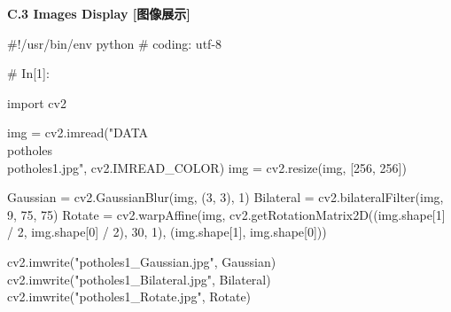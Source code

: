 \documentclass{MathorCupmodeling}
\begin{document}
\textbf{C.3 Images Display [图像展示]}
\begin{python}
#!/usr/bin/env python
# coding: utf-8

# In[1]:


import cv2

img = cv2.imread("DATA\\potholes\\potholes1.jpg", cv2.IMREAD_COLOR)
img = cv2.resize(img, [256, 256])

Gaussian = cv2.GaussianBlur(img, (3, 3), 1)
Bilateral = cv2.bilateralFilter(img, 9, 75, 75)
Rotate = cv2.warpAffine(img, cv2.getRotationMatrix2D((img.shape[1] / 2, img.shape[0] / 2), 30, 1),
                        (img.shape[1], img.shape[0]))

cv2.imwrite("potholes1_Gaussian.jpg", Gaussian)
cv2.imwrite("potholes1_Bilateral.jpg", Bilateral)
cv2.imwrite("potholes1_Rotate.jpg", Rotate)

\end{python}
\end{document}
